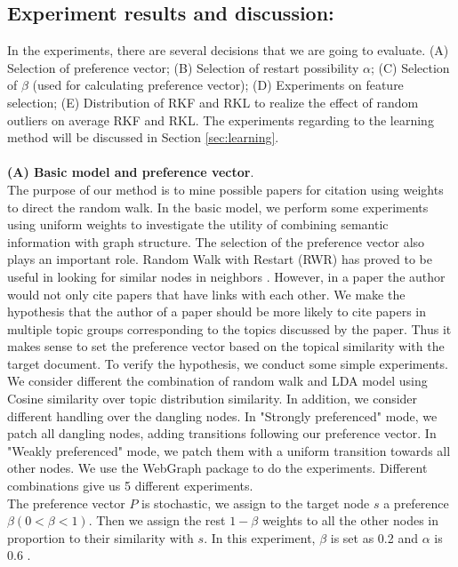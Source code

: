 \documentclass{article} %
\begin{document}
\subsection{Experiment results and discussion:} 
In the experiments, there are several decisions that we are going to evaluate. (A) Selection of preference vector; (B) Selection of restart possibility $\alpha$; (C) Selection of $\beta$ (used for calculating preference vector); (D) Experiments on feature selection; (E) Distribution of RKF and RKL to realize the effect of random outliers on average RKF and RKL. The experiments regarding to the learning method will be discussed in Section \ref{sec:learning}.\\
\\
\textbf{(A) Basic model and preference vector}.\\ 
The purpose of our method is to mine possible papers for citation using weights to direct the random walk. In the basic model, we perform some experiments using uniform weights to investigate the utility of combining semantic information with graph structure. The selection of the preference vector also plays an important role. Random Walk with Restart (RWR) has proved to be useful in looking for similar nodes in neighbors  \cite{Backstrom:2011:SRW:1935826.1935914,Tong2006}. However, in a paper the author would not only cite papers that have links with each other. We make the hypothesis that the author of a paper should be more likely to cite papers in multiple topic groups corresponding to the topics discussed by the paper. Thus it makes sense to set the preference vector based on the topical similarity with the target document. To verify the hypothesis, we conduct some simple experiments. We consider different the combination of random walk and LDA model using Cosine similarity over topic distribution similarity. In addition, we consider different handling over the dangling nodes. In "Strongly preferenced" mode, we patch all dangling nodes, adding transitions following our preference vector. In "Weakly preferenced" mode, we patch them with a uniform transition towards all other nodes. We use the WebGraph\cite{Boldi2004} package to do the experiments. Different combinations give us 5 different experiments.\\
The preference vector $P$ is stochastic, we assign to the target node $s$ a preference $\beta (0< \beta <1)$. Then we assign the rest $1-\beta$ weights to all the other nodes in proportion to their similarity with $s$. In this experiment, $\beta$ is set as 0.2 and $\alpha$ is 0.6 .\\
\end{document}
